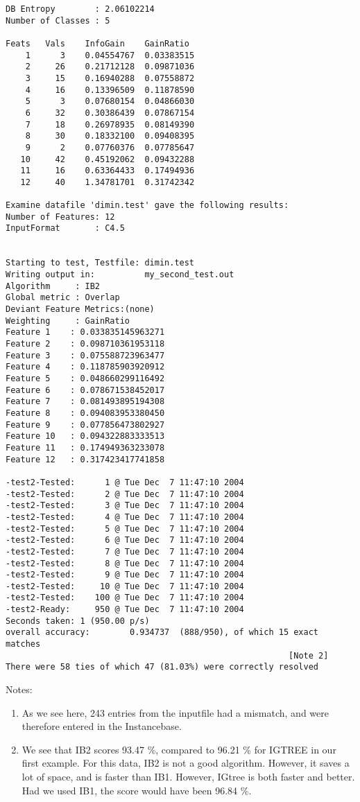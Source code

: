 \begin{footnotesize}
\begin{verbatim}
DB Entropy        : 2.06102214
Number of Classes : 5

Feats	Vals	InfoGain	GainRatio
    1      3	0.04554767	0.03383515
    2     26	0.21712128	0.09871036
    3     15	0.16940288	0.07558872
    4     16	0.13396509	0.11878590
    5      3	0.07680154	0.04866030
    6     32	0.30386439	0.07867154
    7     18	0.26978935	0.08149390
    8     30	0.18332100	0.09408395
    9      2	0.07760376	0.07785647
   10     42	0.45192062	0.09432288
   11     16	0.63364433	0.17494936
   12     40	1.34781701	0.31742342

Examine datafile 'dimin.test' gave the following results:
Number of Features: 12
InputFormat       : C4.5


Starting to test, Testfile: dimin.test
Writing output in:          my_second_test.out
Algorithm     : IB2
Global metric : Overlap
Deviant Feature Metrics:(none)
Weighting     : GainRatio
Feature 1	 : 0.033835145963271
Feature 2	 : 0.098710361953118
Feature 3	 : 0.075588723963477
Feature 4	 : 0.118785903920912
Feature 5	 : 0.048660299116492
Feature 6	 : 0.078671538452017
Feature 7	 : 0.081493895194308
Feature 8	 : 0.094083953380450
Feature 9	 : 0.077856473802927
Feature 10	 : 0.094322883333513
Feature 11	 : 0.174949363233078
Feature 12	 : 0.317423417741858

-test2-Tested:      1 @ Tue Dec  7 11:47:10 2004
-test2-Tested:      2 @ Tue Dec  7 11:47:10 2004
-test2-Tested:      3 @ Tue Dec  7 11:47:10 2004
-test2-Tested:      4 @ Tue Dec  7 11:47:10 2004
-test2-Tested:      5 @ Tue Dec  7 11:47:10 2004
-test2-Tested:      6 @ Tue Dec  7 11:47:10 2004
-test2-Tested:      7 @ Tue Dec  7 11:47:10 2004
-test2-Tested:      8 @ Tue Dec  7 11:47:10 2004
-test2-Tested:      9 @ Tue Dec  7 11:47:10 2004
-test2-Tested:     10 @ Tue Dec  7 11:47:10 2004
-test2-Tested:    100 @ Tue Dec  7 11:47:10 2004
-test2-Ready:     950 @ Tue Dec  7 11:47:10 2004
Seconds taken: 1 (950.00 p/s)
overall accuracy:        0.934737  (888/950), of which 15 exact matches 
                                                         [Note 2]
There were 58 ties of which 47 (81.03%) were correctly resolved
\end{verbatim}
\end{footnotesize}


Notes:
\begin{enumerate}
\item As we see here, 243 entries from the inputfile had a mismatch,
and were therefore entered in the Instancebase.
\item We see that IB2 scores 93.47 \%, compared to 96.21 \% for IGTREE
in our first example. 
For this data, IB2 is not a good algorithm. However, it saves a
lot of space, and is faster than IB1. However, IGtree is both faster and
better. Had we used IB1, the score would have been 96.84 \%.
\end{enumerate}

